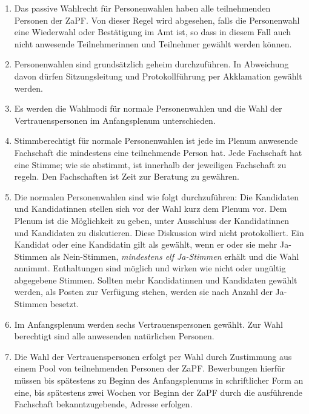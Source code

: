 \begin{enumerate}
\item Das passive Wahlrecht für Personenwahlen haben alle teilnehmenden Personen
der ZaPF. Von dieser Regel wird abgesehen, falls die Personenwahl eine
Wiederwahl oder Bestätigung im Amt ist, so dass in diesem Fall auch nicht
anwesende Teilnehmerinnen und Teilnehmer gewählt werden können.

\item Personenwahlen sind grundsätzlich geheim durchzuführen.
In Abweichung davon dürfen Sitzungsleitung und Protokollführung per
Akklamation gewählt werden.

\item Es werden die Wahlmodi für normale Personenwahlen und die Wahl der
Vertrauenspersonen im Anfangsplenum unterschieden.

\item Stimmberechtigt für normale Personenwahlen ist jede im Plenum anwesende
Fachschaft die mindestens eine teilnehmende Person hat.
Jede Fachschaft hat eine Stimme; wie sie abstimmt, ist innerhalb der
jeweiligen Fachschaft zu regeln.
Den Fachschaften ist Zeit zur Beratung zu gewähren.

\item Die normalen Personenwahlen sind wie folgt durchzuführen:
Die Kandidaten und Kandidatinnen stellen sich vor der Wahl kurz dem
Plenum vor.
Dem Plenum ist die Möglichkeit zu geben, unter Ausschluss der Kandidatinnen
und Kandidaten zu diskutieren.
Diese Diskussion wird nicht protokolliert.
Ein Kandidat oder eine Kandidatin gilt als gewählt, wenn er oder sie mehr
Ja-Stimmen als Nein-Stimmen, \emph{mindestens elf Ja-Stimmen}
erhält und die Wahl annimmt.
Enthaltungen sind möglich und wirken wie nicht oder ungültig abgegebene
Stimmen.
Sollten mehr Kandidatinnen und Kandidaten gewählt werden, als Posten zur
Verfügung stehen, werden sie nach Anzahl der Ja-Stimmen besetzt.

\item Im Anfangsplenum werden sechs Vertrauenspersonen gewählt. Zur Wahl
berechtigt sind alle anwesenden natürlichen Personen.

\item Die Wahl der Vertrauenspersonen erfolgt per Wahl durch
Zustimmung aus einem Pool von teilnehmenden Personen der ZaPF.
Bewerbungen hierfür müssen bis spätestens zu Beginn des Anfangsplenums
in schriftlicher Form an eine, bis spätestens zwei Wochen vor Beginn der
ZaPF durch die ausführende Fachschaft bekanntzugebende, Adresse erfolgen.


\end{enumerate}
